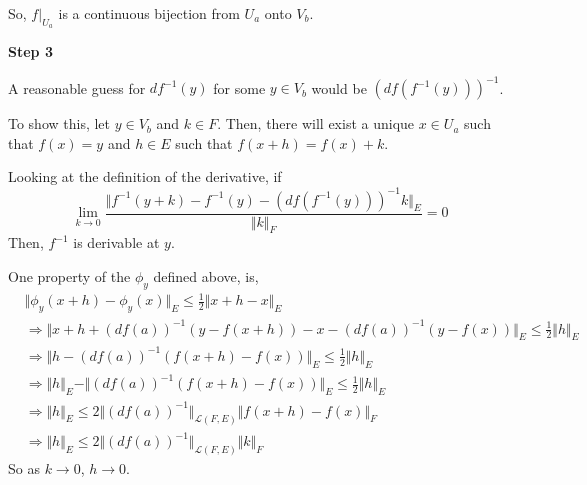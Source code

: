 \documentclass{article}
\begin{document}
So, \(f|_{U_a}\) is a continuous bijection from \(U_a\) onto \(V_b\).

\textbf{Step 3}

A reasonable guess for \(df^{-1}(y)\) for some \(y\in V_b\) would be \((df(f^{-1}(y)))^{-1}\).

To show this, let \(y\in V_b\) and \(k\in F\).  Then, there will exist a unique \(x\in U_a\) such that \(f(x)=y\) and \(h\in E\) such that \(f(x+h)=f(x)+k\).

Looking at the definition of the derivative, if
\[\lim_{k\to 0}\frac{\Vert f^{-1}(y+k)-f^{-1}(y)-(df(f^{-1}(y)))^{-1}k\Vert_E}{\Vert k\Vert_F}=0\]
Then, \(f^{-1}\) is derivable at \(y\).

One property of the \(\phi_y\) defined above, is,
\begin{align*}
    &\Vert\phi_y(x+h)-\phi_y(x)\Vert_E\leq\frac{1}{2}\Vert x+h-x\Vert_E\\
    &\Rightarrow\Vert x+h+(df(a))^{-1}(y-f(x+h))-x-(df(a))^{-1}(y-f(x))\Vert_E\leq\frac{1}{2}\Vert h\Vert_E\\
    &\Rightarrow\Vert h-(df(a))^{-1}(f(x+h)-f(x))\Vert_E\leq\frac{1}{2}\Vert h\Vert_E\\
    &\Rightarrow\Vert h\Vert_E-\Vert(df(a))^{-1}(f(x+h)-f(x))\Vert_E\leq\frac{1}{2}\Vert h\Vert_E\\
    &\Rightarrow\Vert h\Vert_E\leq 2\Vert(df(a))^{-1}\Vert_{\mathcal{L}(F,E)}\Vert f(x+h)-f(x)\Vert_F\\
    &\Rightarrow\Vert h\Vert_E\leq 2\Vert(df(a))^{-1}\Vert_{\mathcal{L}(F,E)}\Vert k\Vert_F
\end{align*}
So as \(k\to 0\), \(h\to 0\).
\end{document}
